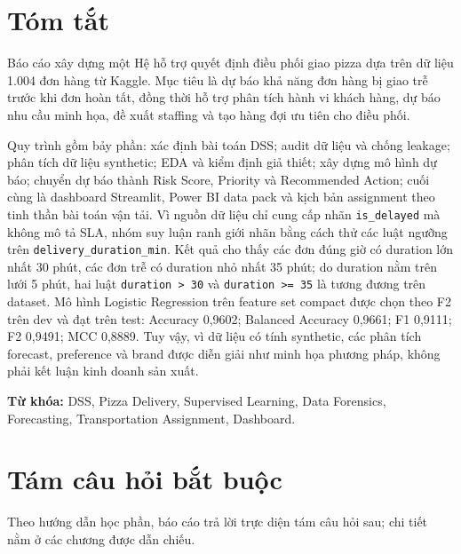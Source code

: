 \documentclass[12pt,a4paper,oneside]{report}
\newcommand{\code}[1]{\nolinkurl{#1}}
\begin{document}
\chapter*{Tóm tắt}

Báo cáo xây dựng một Hệ hỗ trợ quyết định điều phối giao pizza dựa trên dữ liệu
1.004 đơn hàng từ Kaggle. Mục tiêu là dự báo khả năng đơn hàng bị giao trễ trước
khi đơn hoàn tất, đồng thời hỗ trợ phân tích hành vi khách hàng, dự báo nhu cầu
minh họa, đề xuất staffing và tạo hàng đợi ưu tiên cho điều phối.

Quy trình gồm bảy phần: xác định bài toán DSS; audit dữ liệu và chống leakage;
phân tích dữ liệu synthetic; EDA và kiểm định giả thiết; xây dựng mô hình dự
báo; chuyển dự báo thành Risk Score, Priority và Recommended Action; cuối cùng
là dashboard Streamlit, Power BI data pack và kịch bản assignment theo tinh
thần bài toán vận tải. Vì nguồn dữ liệu chỉ cung cấp nhãn
\code{is\_delayed} mà không mô tả SLA, nhóm suy luận ranh giới nhãn bằng cách
thử các luật ngưỡng trên \code{delivery\_duration\_min}. Kết quả cho thấy các
đơn đúng giờ có duration lớn nhất 30 phút, các đơn trễ có duration nhỏ nhất
35 phút; do duration nằm trên lưới 5 phút, hai luật \code{duration > 30} và
\code{duration >= 35} là tương đương trên dataset. Mô hình Logistic Regression
trên feature set compact được chọn theo F2 trên dev và đạt trên test: Accuracy
0,9602; Balanced Accuracy 0,9661; F1 0,9111; F2 0,9491; MCC 0,8889. Tuy vậy,
vì dữ liệu có tính synthetic, các phân tích forecast, preference và brand được
diễn giải như minh họa phương pháp, không phải kết luận kinh doanh sản xuất.

\vspace{6pt}
\noindent\textbf{Từ khóa:} DSS, Pizza Delivery, Supervised Learning, Data
Forensics, Forecasting, Transportation Assignment, Dashboard.

\chapter*{Tám câu hỏi bắt buộc}

Theo hướng dẫn học phần, báo cáo trả lời trực diện tám câu hỏi sau; chi tiết nằm
ở các chương được dẫn chiếu.
\end{document}
